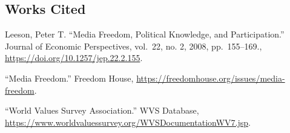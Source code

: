 \documentclass[
]{article}
\begin{document}
\hypertarget{works-cited}{%
\subsection{Works Cited}\label{works-cited}}

Leeson, Peter T. ``Media Freedom, Political Knowledge, and
Participation.'' Journal of Economic Perspectives, vol.~22, no. 2, 2008,
pp.~155--169., \url{https://doi.org/10.1257/jep.22.2.155}.

``Media Freedom.'' Freedom House,
\url{https://freedomhouse.org/issues/media-freedom}.

``World Values Survey Association.'' WVS Database,
\url{https://www.worldvaluessurvey.org/WVSDocumentationWV7.jsp}.
\end{document}
